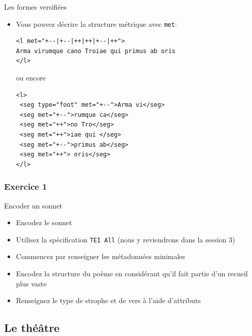 \documentclass[11pt,aspectratio=1610]{beamer}
\begin{document}
\begin{frame}[containsverbatim]{Les formes versifiées}
\begin{itemize}
\item Vous pouvez décrire la structure métrique avec \texttt{met}:


\begin{verbatim}
<l met="+--|+--|++|++|+--|++">
Arma virumque cano Troiae qui primus ab oris
</l>
\end{verbatim}
ou encore 
\begin{verbatim}
<l>
 <seg type="foot" met="+--">Arma vi</seg>
 <seg met="+--">rumque ca</seg>
 <seg met="++">no Tro</seg>
 <seg met="++">iae qui </seg>
 <seg met="+--">primus ab</seg>
 <seg met="++"> oris</seg>
</l>
\end{verbatim}
\end{itemize}
\end{frame}


\subsubsection{Exercice 1}
\begin{frame}{Encoder un sonnet}
\begin{itemize}
\item Encodez le sonnet 
\item Utilisez la spécification \texttt{TEI All} (nous y reviendrons dans la session 3)
\item Commencez par renseigner les métadonnées minimales
\item Encodez la structure du poème en considérant qu'il fait partie d'un recueil plus vaste
\item Renseignez le type de strophe et de vers à l'aide d'attributs
\end{itemize}
\end{frame}

\subsection{Le théâtre}
\end{document}
